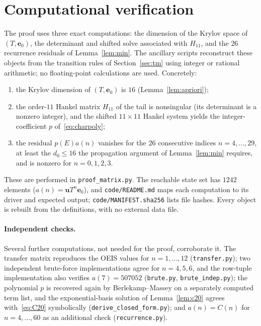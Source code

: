 \documentclass[11pt]{article}
\theoremstyle{definition}
\begin{document}
\section{Computational verification}\label{sec:comp}

The proof uses three exact computations: the dimension of the Krylov space of $(T,\mathbf e_0)$,
the determinant and shifted solve associated with $H_{11}$, and the $26$ recurrence residuals of
Lemma~\ref{lem:min}. The ancillary scripts reconstruct these objects from the transition rules of
Section~\ref{sec:tm} using integer or rational arithmetic; no floating-point calculations are
used. Concretely:
\begin{enumerate}
\item the Krylov dimension of $(T,\mathbf e_0)$ is $16$ (Lemma~\ref{lem:apriori});
\item the order-$11$ Hankel matrix $H_{11}$ of the tail is nonsingular (its determinant is a
nonzero integer), and the shifted $11\times11$ Hankel system yields the integer-coefficient $p$
of~\eqref{eq:charpoly};
\item the residual $p(E)a(n)$ vanishes for the $26$ consecutive indices $n=4,\dots,29$, at least
the $d_0\le16$ the propagation argument of Lemma~\ref{lem:min} requires, and is nonzero for
$n=0,1,2,3$.
\end{enumerate}
These are performed in \texttt{proof\_matrix.py}. The reachable state set has $1242$ elements
($a(n)=\mathbf u T^n\mathbf e_0$), and \texttt{code/README.md} maps each computation to its driver
and expected output; \texttt{code/MANIFEST.sha256} lists file hashes. Every object is rebuilt from
the definitions, with no external data file.

\paragraph{Independent checks.}
Several further computations, not needed for the proof, corroborate it. The transfer matrix
reproduces the OEIS values for $n=1,\dots,12$ (\texttt{transfer.py}); two independent brute-force
implementations agree for $n=4,5,6$, and the row-tuple implementation also verifies $a(7)=507052$
(\texttt{brute.py}, \texttt{brute\_indep.py}); the polynomial $p$ is recovered again by
Berlekamp--Massey on a separately computed term list, and the exponential-basis solution of
Lemma~\ref{lem:c20} agrees with~\eqref{eq:C20} symbolically (\texttt{derive\_closed\_form.py});
and $a(n)=C(n)$ for $n=4,\dots,60$ as an additional check (\texttt{recurrence.py}).
\end{document}
